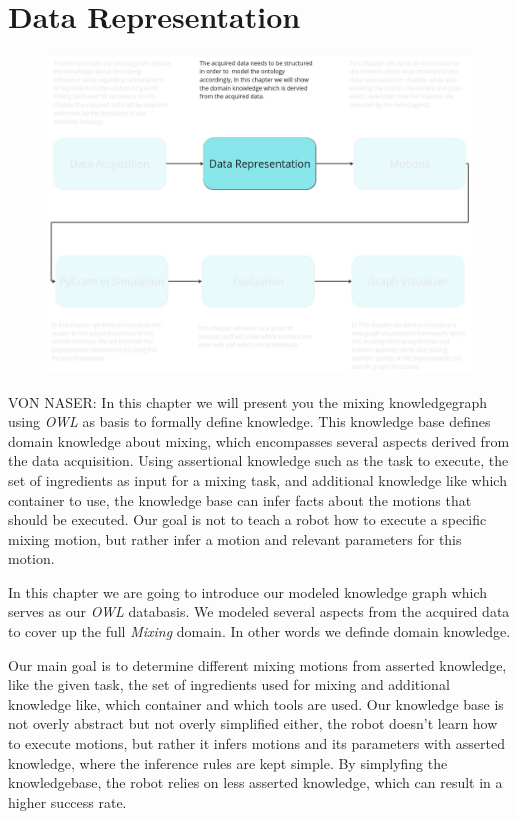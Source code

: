 \chapter{Data Representation}
\label{chap:Data_representation}
\begin{figure}[H]
    \includegraphics[scale=0.3]{Graphics/overview_2.jpg}
\end{figure}
VON NASER: 
In this chapter we will present you the mixing knowledgegraph using \textit{OWL} as basis to formally define knowledge.
This knowledge base defines domain knowledge about mixing, which encompasses several aspects derived from the data acquisition.
Using assertional knowledge such as the task to execute, the set of ingredients as input for a mixing task, 
and additional knowledge like which container to use, the knowledge base can infer facts about the motions that should be executed.
Our goal is not to teach a robot how to execute a specific mixing motion, but rather infer a motion and relevant parameters for this motion. 


In this chapter we are going to introduce our modeled knowledge graph which serves as our \textit{OWL} databasis. We modeled several aspects from the acquired data to cover up the full \textit{Mixing} domain. In other words we definde domain knowledge.

Our main goal is to determine different mixing motions from asserted knowledge, like the given task, the set of ingredients used for mixing and additional knowledge like, which container and which tools are used.
Our knowledge base is not overly abstract but not overly simplified either, the robot doesn't learn how to execute motions, but rather it infers motions and its parameters with asserted knowledge, where the inference rules are kept simple.
By simplyfing the knowledgebase, the robot relies on less asserted knowledge, which can result in a higher success rate.

